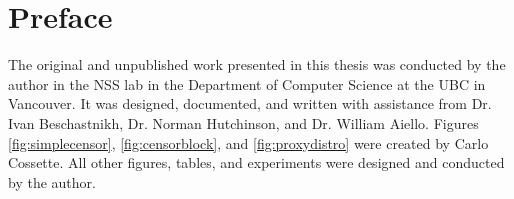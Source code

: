 
\chapter{Preface} 

The original and unpublished work presented in this thesis was conducted by the author in the \ac{NSS} lab in the Department of Computer Science at the \ac{UBC} in Vancouver. It was designed, documented, and written with assistance from Dr. Ivan Beschastnikh, Dr. Norman Hutchinson, and Dr. William Aiello. Figures \ref{fig:simplecensor}, \ref{fig:censorblock}, and \ref{fig:proxydistro} were created by Carlo Cossette. All other figures, tables, and experiments were designed and conducted by the author.
